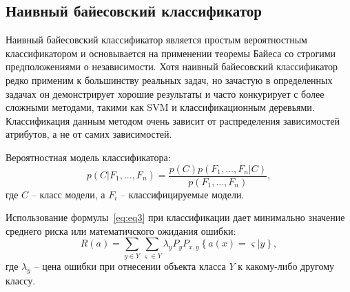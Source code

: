 \subsection{Наивный байесовский классификатор}
Наивный байесовский классификатор является простым вероятностным классификатором и основывается на применении теоремы Байеса со строгими предположениями о независимости. Хотя наивный байесовский классификатор редко применим к большинству реальных задач, но зачастую в определенных задачах он демонстрирует хорошие результаты и часто конкурирует с более сложными методами, такими как SVM и классификационным деревьями. Классификация данным методом очень зависит от распределения зависимостей атрибутов, а не от самих зависимостей.
\par
Вероятностная модель классификатора:
\begin{equation}\label{eq:eq3}
p(C|F_{1},...,F_{n}) = \frac{p(C)p(F_{1},...,F_{n}|C)}{p(F_{1},...,F_{n})},
\end{equation}
где $C$ -- класс модели, а $F_{i}$ -- классифицируемые модели.
\par
Использование формулы~\eqref{eq:eq3} при классификации дает минимально значение среднего риска или математичского ожидания ошибки:
\begin{equation}\label{eq:eq4}
R(a) = \sum_{y\in Y}\sum_{\varsigma\in Y}\lambda_{y}P_{y}P_{x,y}\left\lbrace a(x)=\varsigma|y \right\rbrace ,
\end{equation}
где $\lambda_{y}$ -- цена ошибки при отнесении объекта класса $Y$ к какому-либо другому классу.
